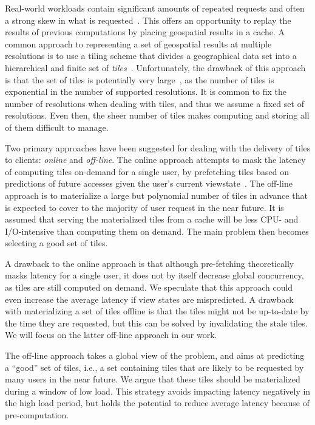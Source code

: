 \documentclass[11pt, oneside]{report}
\begin{document}
{%
Real-world workloads contain significant amounts of repeated requests and often a strong skew in what is requested~\cite{fisher07,talagala00}. This offers an opportunity to replay the results of previous computations by placing geospatial results in a cache. A common approach to representing a set of geospatial results at multiple resolutions is to use a tiling scheme that divides a geographical data set into a hierarchical and finite set of \emph{tiles}~\cite{decola93}. Unfortunately, the drawback of this approach is that the set of tiles is potentially very large~\cite{garcia11}, as the number of tiles is exponential in the number of supported resolutions. It is common to fix the number of resolutions when dealing with tiles, and thus we assume a fixed set of resolutions. Even then, the sheer number of tiles makes computing and storing all of them difficult to manage.

Two primary approaches have been suggested for dealing with the delivery of tiles to clients: \emph{online} and \emph{off-line}. The online approach attempts to mask the latency of computing tiles on-demand for a single user, by prefetching tiles based on predictions of future accesses given the user's current viewstate~\cite{KKK01:Prefetching,KKK01:Prefetching2,LKK+02:Prefetching}. The off-line approach is to materialize a large but polynomial number of tiles in advance that is expected to cover to the majority of user request in the near future. It is assumed that serving the materialized tiles from a cache will be less CPU- and I/O-intensive than computing them on demand. The main problem then becomes selecting a good set of tiles. 

A drawback to the online approach is that although pre-fetching theoretically masks latency for a single user, it does not by itself decrease global concurrency, as tiles are still computed on demand. We speculate that this approach could even increase the average latency if view states are mispredicted. A drawback with materializing a set of tiles offline is that the tiles might not be up-to-date by the time they are requested, but this can be solved by invalidating the stale tiles. We will focus on the latter off-line approach in our work.

The off-line approach takes a global view of the problem, and aims at predicting a ``good'' set of tiles, i.e., a set containing tiles that are likely to be requested by many users in the near future. We argue that these tiles should be materialized during a window of low load. This strategy avoids impacting latency negatively in the high load period, but holds the potential to reduce average latency because of pre-computation.

}
\end{document}
